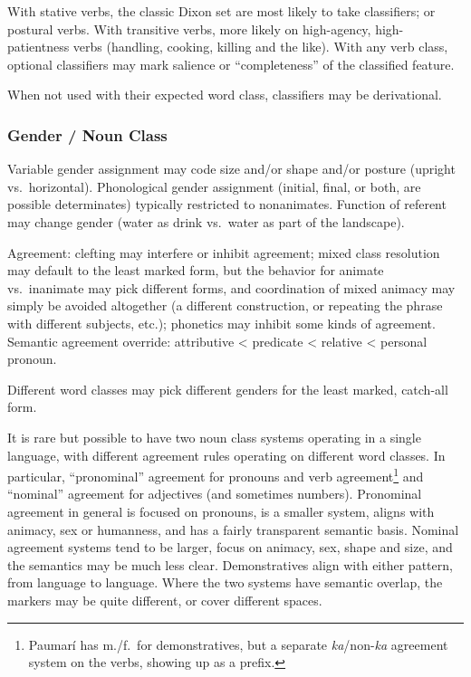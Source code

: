 \documentclass[11pt]{article}
\begin{document}
With stative verbs, the classic Dixon set are most likely to take
classifiers; or postural verbs.  With transitive verbs, more likely on
high-agency, high-patientness verbs (handling, cooking, killing and
the like).  With any verb class, optional classifiers may mark
salience or ``completeness'' of the classified feature.

When not used with their expected word class, classifiers may be
derivational.

\subsubsection{Gender / Noun Class}
Variable gender assignment may code size and/or shape and/or posture
(upright vs.\ horizontal).  Phonological gender assignment (initial,
final, or both, are possible determinates) typically restricted to
nonanimates.  Function of referent may change gender (water as drink
vs.\ water as part of the landscape).

Agreement: clefting may interfere or inhibit agreement; mixed class
resolution may default to the least marked form, but the behavior for
animate vs.\ inanimate may pick different forms, and coordination of
mixed animacy may simply be avoided altogether (a different
construction, or repeating the phrase with different subjects, etc.);
phonetics may inhibit some kinds of agreement.  Semantic agreement
override: attributive < predicate < relative < personal pronoun.

Different word classes may pick different genders for the least
marked, catch-all form.

It is rare but possible to have two noun class systems operating in a
single language, with different agreement rules operating on different
word classes.  In particular, ``pronominal'' agreement for pronouns
and verb agreement\footnote{Paumarí has m./f.\ for demonstratives, but
a separate \textit{ka}/non-\textit{ka} agreement system on the
verbs, showing up as a prefix.} and ``nominal'' agreement for
adjectives (and sometimes numbers).  Pronominal agreement in general
is focused on pronouns, is a smaller system, aligns with animacy, sex
or humanness, and has a fairly transparent semantic basis.  Nominal
agreement systems tend to be larger, focus on animacy, sex, shape and
size, and the semantics may be much less clear.  Demonstratives align
with either pattern, from language to language.  Where the two systems
have semantic overlap, the markers may be quite different, or cover
different spaces.
\end{document}

